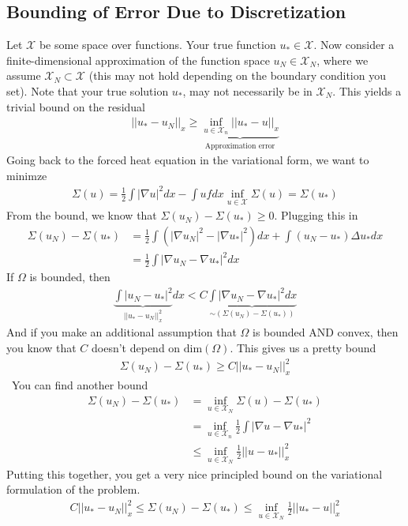 \subsection{Bounding of Error Due to Discretization}
Let $\mathcal X$ be some space over functions. Your true function $u_* \in \mathcal X$. Now consider a finite-dimensional approximation of the function space $u_N \in \mathcal X_N$, where we assume $\mathcal X_N \subset \mathcal X$ (this may not hold depending on the boundary condition you set). Note that your true solution $u_*$, may not necessarily be in $\mathcal X_N$. This yields a trivial bound on the residual
\begin{align}
	||u_* - u_N||_{x} \geq \underbrace{\inf_{u \in \mathcal X_n} ||u_* - u||_x}_{\text{Approximation error}}
\end{align}
Going back to the forced heat equation in the variational form, we want to minimze
\begin{align}
	\Sigma(u) = \frac{1}{2} \int |\nabla u |^2 dx - \int u f dx
	\inf_{u \in \mathcal X} \Sigma(u) = \Sigma(u_*)
\end{align}
From the bound, we know that $\Sigma(u_N)  - \Sigma(u_*)\geq  0$. Plugging this in
\begin{align}
	\Sigma(u_N) - \Sigma(u_*) & = \frac{1}{2} \int( |\nabla u_N|^2 - |\nabla u_*|^2 ) dx + \int (u_N - u_*) \Delta u_* dx\\
	& = \frac{1}{2} \int |\nabla u_N - \nabla u_*|^2 dx
\end{align}
If $\Omega$ is bounded, then
\begin{align}
	\underbrace{\int |u_N - u_*|^2}_{||u_* - u_N||^2_x} dx < C \underbrace{\int |\nabla u_N - \nabla u_*|^2 dx}_{\sim (\Sigma(u_N) - \Sigma(u_*))}
\end{align}
And if you make an additional assumption that $\Omega$ is bounded AND convex, then you know that $C$ doesn't depend on $\text{dim}(\Omega)$. This gives us a pretty bound
\begin{align}
	\Sigma(u_N) - \Sigma(u_*) \geq  C || u_* - u_N||^2_x
\end{align}\
You can find another bound
\begin{align}
	\Sigma(u_N) - \Sigma(u_*) & = \inf_{u \in \mathcal X_N} \Sigma(u) - \Sigma(u_*)\\
	& = \inf_{u \in \mathcal X_n} \frac{1}{2} \int |\nabla u - \nabla u_*|^2\\
	& \leq \inf_{u \in \mathcal X_N} \frac{1}{2} || u - u_* ||^2_x
\end{align}
Putting this together, you get a very nice principled bound on the variational formulation of the problem.
\begin{align}
	\boxed{C || u_* - u_N||^2_x \leq \Sigma(u_N) - \Sigma(u_*) \leq \inf_{u \in \mathcal X_N} \frac{1}{2} || u_* - u ||^2_x}
\end{align}


